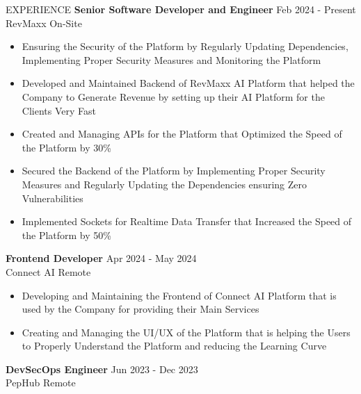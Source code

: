 \documentclass{resume}
\begin{document}
\vspace{-0.4em}
\begin{rSection}{EXPERIENCE}
  {\bf Senior Software Developer and Engineer} \hfill {Feb 2024 - Present}\\
  RevMaxx \hfill {On-Site}
  \vspace{-0.4em}
  \begin{itemize}
    \item {Ensuring the Security of the Platform by Regularly Updating Dependencies, Implementing Proper Security Measures and Monitoring the Platform}
          \vspace{-0.2em}
    \item {Developed and Maintained Backend of RevMaxx AI Platform that helped the Company to Generate Revenue by setting up their AI Platform for the Clients Very Fast}
          \vspace{-0.2em}
    \item {Created and Managing APIs for the Platform that Optimized the Speed of the Platform by 30\%}
          \vspace{-0.2em}
    \item {Secured the Backend of the Platform by Implementing Proper Security Measures and Regularly Updating the Dependencies ensuring Zero Vulnerabilities}
          \vspace{-0.2em}
    \item {Implemented Sockets for Realtime Data Transfer that Increased the Speed of the Platform by 50\%}
  \end{itemize}
  \vspace{-0.4em}
  {\bf Frontend Developer} \hfill {Apr 2024 - May 2024}\\
  Connect AI \hfill {Remote}
  \vspace{-0.4em}
  \begin{itemize}
    \item {Developing and Maintaining the Frontend of Connect AI Platform that is used by the Company for providing their Main Services}
          \vspace{-0.2em}
    \item {Creating and Managing the UI/UX of the Platform that is helping the Users to Properly Understand the Platform and reducing the Learning Curve}
  \end{itemize}
  \vspace{-0.4em}
  {\bf DevSecOps Engineer} \hfill {Jun 2023 - Dec 2023}\\
  PepHub \hfill {Remote}
  \vspace{-0.4em}

\end{rSection}
\end{document}
